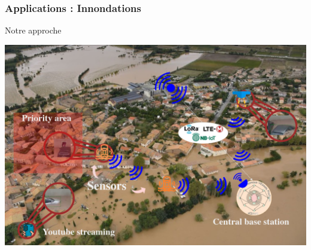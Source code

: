 \begin{frame}
	\frametitle{Applications : Innondations}
	\vspace{0.3cm}
	\begin{block}{}
		\centering
		\Large Notre approche
	\end{block}
	\vspace{0.2cm}
	\centering
	\includegraphics[scale=0.2]{Files/fig/scenaioLORA2.png}
\end{frame}

